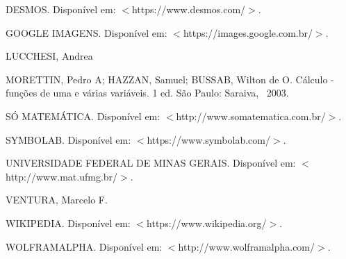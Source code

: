 \pagebreak

\begin{thebibliography}{}

DESMOS.
Disponível em: $<$https://www.desmos.com/$>$.

GOOGLE IMAGENS.
Disponível em: $<$https://images.google.com.br/$>$.

LUCCHESI, Andrea

MORETTIN, Pedro A; HAZZAN, Samuel; BUSSAB, Wilton de O.
Cálculo - funções de uma e várias variáveis.
1 ed.
São Paulo:
Saraiva, \
2003.

SÓ MATEMÁTICA.
Disponível em: $<$http://www.somatematica.com.br/$>$.

SYMBOLAB.
Disponível em: $<$https://www.symbolab.com/$>$.

UNIVERSIDADE FEDERAL DE MINAS GERAIS.
Disponível em: $<$http://www.mat.ufmg.br/$>$.

VENTURA, Marcelo F.

WIKIPEDIA.
Disponível em: $<$https://www.wikipedia.org/$>$.

WOLFRAMALPHA.
Disponível em: $<$http://www.wolframalpha.com/$>$.

\end{thebibliography}

